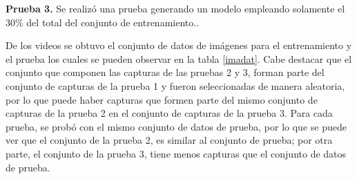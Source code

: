 \documentclass[twoside,spanish,ESP,MSc]{plantillaLabUPV}
\theoremstyle{definition}
\begin{document}
\checkmark\textbf{Prueba 3.} Se realizó una prueba generando un modelo empleando solamente el 30\% del total del conjunto de entrenamiento..


De los videos se obtuvo el conjunto de datos de imágenes para el entrenamiento y el prueba los cuales se pueden observar en la tabla \ref{imadat}. Cabe destacar que el conjunto que componen las capturas de las pruebas 2 y 3, forman parte del conjunto de capturas de la prueba 1 y fueron seleccionadas de manera aleatoria, por lo que puede haber capturas que formen parte del mismo conjunto de capturas de la prueba 2 en el conjunto de capturas de la prueba 3. Para cada prueba, se probó con el mismo conjunto de datos de prueba, por lo que se puede ver que el conjunto de la prueba 2, es similar al conjunto de prueba; por otra parte, el conjunto de la prueba 3, tiene menos capturas que el conjunto de datos de prueba.
\end{document}
